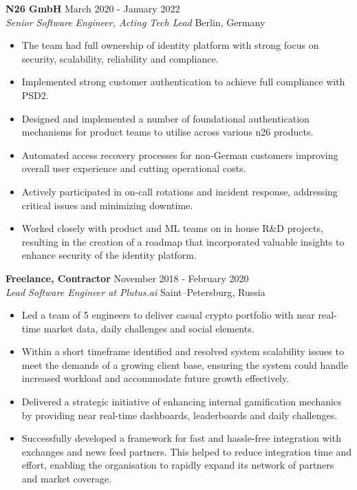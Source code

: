 \documentclass[a4paper]{article}
\newcommand{\employer} [4] {
    \textbf{#1} \hfill {#3} \\
    \textit{#2} \hfill {#4} \\
    \vspace{0mm}
}
\begin{document}
    \employer{N26 GmbH}{Senior Software Engineer, Acting Tech Lead}{March 2020 - January 2022}{Berlin, Germany}
    \begin{itemize}[itemsep=-1mm]
        \item The team had full ownership of identity platform with strong focus on security, scalability, reliability and compliance.
        \item Implemented strong customer authentication to achieve full compliance with PSD2.
        \item Designed and implemented a number of foundational authentication mechanisms for product teams to utilise across various n26 products.
        \item Automated access recovery processes for non-German customers improving overall user experience and cutting operational costs.
        \item Actively participated in on-call rotations and incident response, addressing critical issues and minimizing downtime.
        \item Worked closely with product and ML teams on in house R\&D projects, resulting in the creation of a roadmap that
        incorporated valuable insights to enhance security of the identity platform.
    \end{itemize}

    \employer{Freelance, Contractor}{Lead Software Engineer at Plutus.ai}{November 2018 - February 2020}{Saint–Petersburg, Russia}
    \begin{itemize}[itemsep=-1mm]
        \item Led a team of 5 engineers to deliver casual crypto portfolio with near real-time market data, daily challenges and social elements.
        \item Within a short timeframe identified and resolved system scalability issues to meet the demands of a growing client base,
        ensuring the system could handle increased workload and accommodate future growth effectively.
        \item Delivered a strategic initiative of enhancing internal gamification mechanics by providing near real-time dashboards, leaderboards
        and daily challenges.
        \item Successfully developed a framework for fast and hassle-free integration with exchanges and news feed partners.
        This helped to reduce integration time and effort, enabling the organisation to rapidly expand its network of partners and market coverage.
    \end{itemize}
\end{document}
